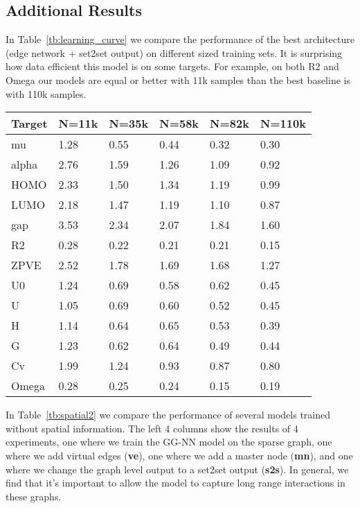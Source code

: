 \documentclass{article}
\begin{document}
\subsection{Additional Results}

In Table~\ref{tb:learning_curve} we compare the performance of the best architecture (edge network + set2set output) on different sized training sets. It is surprising how data efficient this model is on some targets. For example, on both R2 and Omega our models are equal or better with 11k samples than the best baseline is with 110k samples.

\begin{table*}[t]
\centering
\caption{Results from training the edge network + set2set model on different sized training sets (N denotes the number of training samples)}
\label{tb:learning_curve}
\begin{tabular}{llllll}
\hline
Target & N=11k & N=35k & N=58k & N=82k & N=110k \\
\hline
mu     & 1.28    & 0.55    & 0.44    & 0.32    & 0.30     \\
alpha  & 2.76    & 1.59    & 1.26    & 1.09    & 0.92     \\
HOMO   & 2.33    & 1.50    & 1.34    & 1.19    & 0.99     \\
LUMO   & 2.18    & 1.47    & 1.19    & 1.10    & 0.87     \\
gap    & 3.53    & 2.34    & 2.07    & 1.84    & 1.60     \\
R2     & 0.28    & 0.22    & 0.21    & 0.21    & 0.15     \\
ZPVE   & 2.52    & 1.78    & 1.69    & 1.68    & 1.27     \\
U0     & 1.24    & 0.69    & 0.58    & 0.62    & 0.45     \\
U      & 1.05    & 0.69    & 0.60    & 0.52    & 0.45     \\
H      & 1.14    & 0.64    & 0.65    & 0.53    & 0.39     \\
G      & 1.23    & 0.62    & 0.64    & 0.49    & 0.44     \\
Cv     & 1.99    & 1.24    & 0.93    & 0.87    & 0.80     \\
Omega  & 0.28    & 0.25    & 0.24    & 0.15    & 0.19    
\end{tabular}
\end{table*}



In Table~\ref{tb:spatial2} we compare the performance of several models trained without spatial information. The left 4 columns show the results of 4 experiments, one where we train the GG-NN model on the sparse graph, one where we add virtual edges (\textbf{ve}), one where we add a master node (\textbf{mn}), and one where we change the graph level output to a set2set output (\textbf{s2s}). In general, we find that it's important to allow the model to capture long range interactions in these graphs. 
\end{document}
